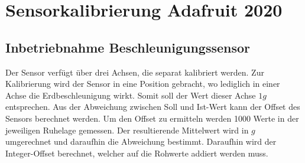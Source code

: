 \documentclass{article}
\begin{document}
\section{Sensorkalibrierung Adafruit 2020}
\subsection{Inbetriebnahme Beschleunigungssensor}
Der Sensor verfügt über drei Achsen, die separat kalibriert werden. Zur Kalibrierung wird der Sensor in eine Position gebracht, wo lediglich in einer Achse die Erdbeschleunigung wirkt. Somit soll der Wert dieser Achse $1g$ entsprechen. Aus der Abweichung zwischen Soll und Ist-Wert kann der Offset des Sensors berechnet werden.
Um den Offset zu ermitteln werden 1000 Werte in der jeweiligen Ruhelage gemessen. Der resultierende Mittelwert wird in $g$ umgerechnet und daraufhin die Abweichung bestimmt. Daraufhin wird der Integer-Offset berechnet, welcher auf die Rohwerte addiert werden muss.
\end{document}
